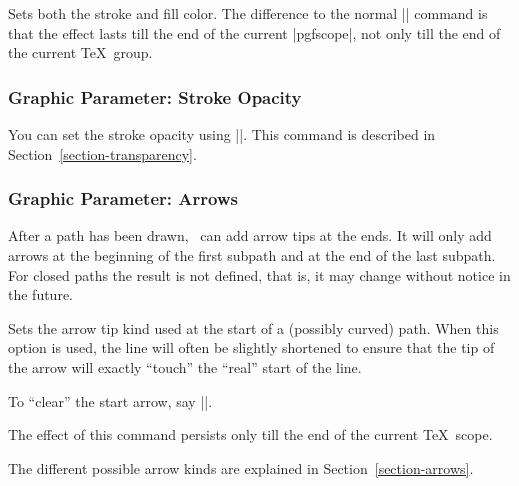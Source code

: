 \begin{command}{\pgfsetcolor{}}
  Sets both the stroke and fill color. The difference to the normal
  |\color| command is that the effect lasts till the end of the
  current |{pgfscope}|, not only till the end of the current \TeX\
  group.
\end{command}


\subsubsection{Graphic Parameter: Stroke Opacity}

You can set the stroke opacity using |\pgfsetstrokeopacity|. This
command is described in Section~\ref{section-transparency}.

\subsubsection{Graphic Parameter: Arrows}

After a path has been drawn, \pgfname\ can add arrow tips at the
ends. It will only add arrows at the beginning of the first subpath
and at the end of the last subpath. For closed paths the result is not
defined, that is, it may change without notice in the future.

\begin{command}{\pgfsetarrowsstart{}}
  Sets the arrow tip kind used at the start of a (possibly curved)
  path. When this option is used, the line will often be slightly
  shortened to ensure that the tip of the arrow will exactly ``touch''
  the ``real'' start of the line.

  To ``clear'' the start arrow, say |\pgfsetarrowsstart{}|.
\begin{codeexample}[]
\begin{pgfpicture}
  \pgfpathmoveto{\pgfpointorigin}
  \pgfpathlineto{\pgfpoint{1cm}{0cm}}
  \pgfpathmoveto{\pgfpoint{0cm}{2mm}}
  \pgfpathlineto{\pgfpoint{1cm}{2mm}}
\end{pgfpicture}
\end{codeexample}

  The effect of this command persists only till the end of the current
  \TeX\ scope.

  The different possible arrow kinds are explained in
  Section~\ref{section-arrows}.
\end{command}


